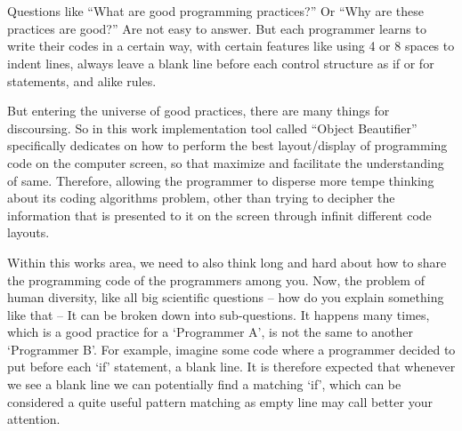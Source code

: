 

%
\cleardoublepage
{}


\chapter{}


\chooselang
{
    Questions like ``What are good programming practices?'' Or ``Why are these practices are good?''
    Are not easy to answer. But each programmer learns to write their codes in a certain way, with
    certain features like using 4 or 8 spaces to indent lines, always leave a blank line before each
    control structure as if or for statements, and alike rules. %

    But entering the universe of good practices, there are many things for discoursing. So in this
    work implementation tool called ``Object Beautifier'' specifically dedicates on how to perform
    the best layout/display of programming code on the computer screen, so that maximize and
    facilitate the understanding of same. Therefore, allowing the programmer to disperse more tempe
    thinking about its coding algorithms problem, other than trying to decipher the information that
    is presented to it on the screen through infinit different code layouts. %

    Within this work\textquotesingle s area, we need to also think long and hard about how to share
    the programming code of the programmers among you. Now, the problem of human diversity, like all
    big scientific questions -- how do you explain something like that -- It can be broken down into
    sub-questions. It happens many times, which is a good practice for a `Programmer A', is not the
    same to another `Programmer B'. For example, imagine some code where a programmer decided to put
    before each `if' statement, a blank line. It is therefore expected that whenever we see a blank
    line we can potentially find a matching `if', which can be considered a quite useful pattern
    matching as empty line may call better your attention. %

}
